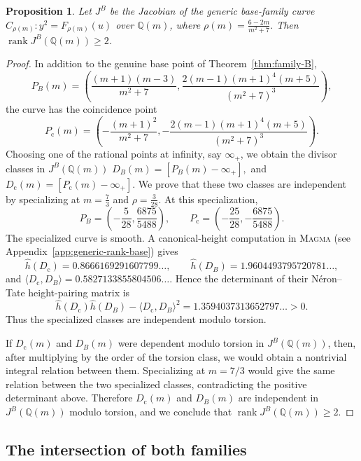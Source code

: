 \documentclass[11pt]{amsart}
\theoremstyle{plain}
\newtheorem{prop}[thm]{Proposition}
\theoremstyle{remark}
\theoremstyle{plain}
\newcommand{\Q}{\mathbb{Q}}
\begin{document}
\begin{prop}\label{prop:base-generic-rank}
Let $J^B$ be the Jacobian of the generic base-family curve
$C_{\rho(m)}\colon y^2=F_{\rho(m)}(u)$ over $\Q(m)$, where
$
\rho(m)=\frac{6-2m}{m^2+7}.
$
Then
$\operatorname{rank}J^B(\Q(m))\geq2$.

\end{prop}

\begin{proof}
In addition to the genuine base point of Theorem~\ref{thm:family-B},
\[
P_B(m)=
\left(
\frac{(m+1)(m-3)}{m^2+7},
\frac{2(m-1)(m+1)^4(m+5)}{(m^2+7)^3}
\right),
\]
the curve has the coincidence point
\[
P_{\mathrm c}(m)=\left(
-\frac{(m+1)^2}{m^2+7},
-\frac{2(m-1)(m+1)^4(m+5)}{(m^2+7)^3}
\right).
\]
Choosing one of the rational points at infinity, say $\infty_+$, we obtain the divisor classes in $J^B(\Q(m))$
$D_B(m)=[P_B(m)-\infty_+],$ and $D_{\mathrm c}(m)=[P_{\mathrm c}(m)-\infty_+]$.
We prove that these two classes are independent by specializing at
$m=\frac73$ and $\rho=\frac3{28}$.
At this specialization,
\[
P_B=
\left(
-\frac5{28},
\frac{6875}{5488}
\right),
\qquad
P_{\mathrm c}=
\left(
-\frac{25}{28},
-\frac{6875}{5488}
\right).
\]
The specialized curve is smooth. A canonical-height computation in
\textsc{Magma} (see Appendix~\ref{app:generic-rank-base}) gives
\[
\widehat h(D_{\mathrm c})
=
0.8666169291607799\ldots,
\qquad
\widehat h(D_B)
=
1.9604493795720781\ldots,
\]
and
$\langle D_{\mathrm c},D_B\rangle = 0.5827133855804506\ldots$.
Hence the determinant of their N\'eron--Tate height-pairing matrix is
\[
\widehat h(D_{\mathrm c})\widehat h(D_B)
-
\langle D_{\mathrm c},D_B\rangle^2
=
1.3594037313652797\ldots>0.
\]
Thus the specialized classes are independent modulo torsion.

If $D_{\mathrm c}(m)$ and $D_B(m)$ were dependent modulo torsion in
$J^B(\Q(m))$, then, after multiplying by the order of the torsion
class, we would obtain a nontrivial integral relation between them.
Specializing at $m=7/3$ would give the same relation between the two
specialized classes, contradicting the positive determinant above.
Therefore $D_{\mathrm c}(m)$ and $D_B(m)$ are independent in
$J^B(\Q(m))$ modulo torsion, and we conclude that
$\operatorname{rank}J^B(\Q(m))\geq2$.

\end{proof}


\subsection{The intersection of both families}
\end{document}
